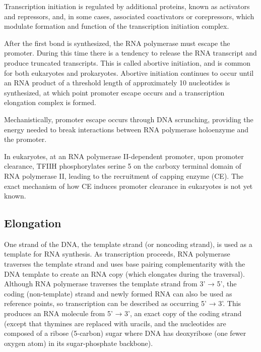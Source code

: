 Transcription initiation is regulated by additional proteins, known as activators and repressors, and, in some cases, associated coactivators or corepressors, which modulate formation and function of the transcription initiation complex.

After the first bond is synthesized, the RNA polymerase must escape the promoter. During this time there is a tendency to release the RNA transcript and produce truncated transcripts. This is called abortive initiation, and is common for both eukaryotes and prokaryotes. Abortive initiation continues to occur until an RNA product of a threshold length of approximately 10 nucleotides is synthesized, at which point promoter escape occurs and a transcription elongation complex is formed.

Mechanistically, promoter escape occurs through DNA scrunching, providing the energy needed to break interactions between RNA polymerase holoenzyme and the promoter.

In eukaryotes, at an RNA polymerase II-dependent promoter, upon promoter clearance, TFIIH phosphorylates serine 5 on the carboxy terminal domain of RNA polymerase II, leading to the recruitment of capping enzyme (CE). The exact mechanism of how CE induces promoter clearance in eukaryotes is not yet known.

\hypertarget{elongation-1}{%
\subsection{Elongation}\label{elongation-1}}

One strand of the DNA, the template strand (or noncoding strand), is used as a template for RNA synthesis. As transcription proceeds, RNA polymerase traverses the template strand and uses base pairing complementarity with the DNA template to create an RNA copy (which elongates during the traversal). Although RNA polymerase traverses the template strand from 3' → 5', the coding (non-template) strand and newly formed RNA can also be used as reference points, so transcription can be described as occurring 5' → 3'. This produces an RNA molecule from 5' → 3', an exact copy of the coding strand (except that thymines are replaced with uracils, and the nucleotides are composed of a ribose (5-carbon) sugar where DNA has deoxyribose (one fewer oxygen atom) in its sugar-phosphate backbone).



